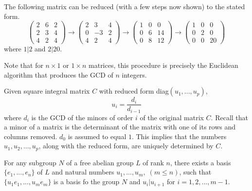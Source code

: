   \begin{example}
    The following matrix can be reduced (with a few steps now shown) to the stated form. 
    \begin{equation}
    \begin{pmatrix} 2&6&2 \\ 2&3&4 \\ 4&2&4 \end{pmatrix} \rightarrow 
    \begin{pmatrix} 2&3&4 \\ 0&-3&2 \\ 4&2&4 \end{pmatrix} \rightarrow
    \begin{pmatrix} 1&0&0 \\ 0&6&14 \\ 0&8&12 \end{pmatrix} \rightarrow
    \begin{pmatrix} 1&0&0 \\ 0&2&0 \\ 0&0&20\end{pmatrix}
    \end{equation}
    where $1|2$ and $2|20$. 
  \end{example}

  Note that for $n \times 1$ or $1 \times n$ matrices, this procedure is precisely the Euclidean algorithm that produces the GCD of $n$ integers. 

  \begin{proposition}
    Given square integral matrix $C$ with  reduced form diag$(u_1, ..., u_p)$, 
    \begin{equation}
      u_i = \frac{d_i}{d_{i-1}}
    \end{equation}
    where $d_i$ is the GCD of the minors of order $i$ of the original matrix $C$. Recall that a minor of a matrix is the determinant of the matrix with one of its rows and columns removed. $d_0$ is assumed to equal $1$. This implies that the numbers $u_1, u_2, ..., u_p$, along with the reduced form, are uniquely determined by $C$. 
  \end{proposition}

  \begin{theorem}
    For any subgroup $N$ of a free abelian group $L$ of rank $n$, there exists a basis $\{e_1, ..., e_n\}$ of $L$ and natural numbers $u_1, ..., u_m, \; (m \leq n)$, such that $\{u_1 e_1, ..., u_m e_m\}$ is a basis fo the group $N$ and $u_i | u_{i+1}$ for $i = 1, 2, ..., m-1$. 
  \end{theorem}
    
